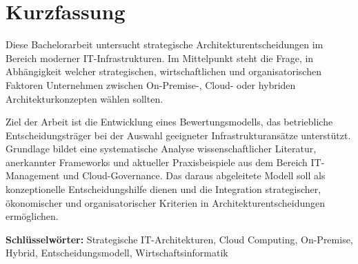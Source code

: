 \chapter*{Kurzfassung}
Diese Bachelorarbeit untersucht strategische Architekturentscheidungen im Bereich moderner IT-Infrastrukturen. 
Im Mittelpunkt steht die Frage, in Abhängigkeit welcher strategischen, wirtschaftlichen und organisatorischen Faktoren 
Unternehmen zwischen On-Premise-, Cloud- oder hybriden Architekturkonzepten wählen sollten. 

Ziel der Arbeit ist die Entwicklung eines Bewertungsmodells, das betriebliche Entscheidungsträger bei der Auswahl 
geeigneter Infrastrukturansätze unterstützt. Grundlage bildet eine systematische Analyse wissenschaftlicher Literatur, 
anerkannter Frameworks und aktueller Praxisbeispiele aus dem Bereich IT-Management und Cloud-Governance. 
Das daraus abgeleitete Modell soll als konzeptionelle Entscheidungshilfe dienen und die Integration 
strategischer, ökonomischer und organisatorischer Kriterien in Architekturentscheidungen ermöglichen. 

\vfill
\textbf{Schlüsselwörter:} Strategische IT-Architekturen, Cloud Computing, On-Premise, Hybrid, Entscheidungsmodell, Wirtschaftsinformatik

